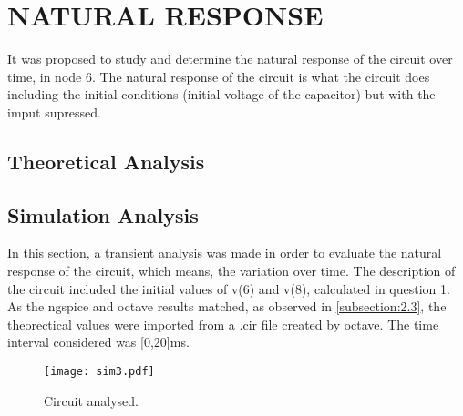 \section{NATURAL RESPONSE}
It was proposed to study and determine the natural response of the circuit over time, in node 6. The natural response of the circuit is what the circuit does including the initial conditions (initial voltage of the capacitor) but with the imput supressed. 

\subsection{Theoretical Analysis}




\subsection{Simulation Analysis}
In this section, a transient analysis was made in order to evaluate the natural response of the circuit, which means, the variation over time. The description of the circuit included the initial values of v(6) and v(8), calculated in question 1. As the ngspice and octave results matched, as observed in \ref{subsection:2.3}, the theorectical values were imported from a .cir file created by octave.
The time interval considered was [0,20]ms.
\begin{figure}[h] \centering
\texttt{[image: sim3.pdf]}
\caption{Circuit analysed.}
\label{fig:sim3}
\end{figure}
\newpage
